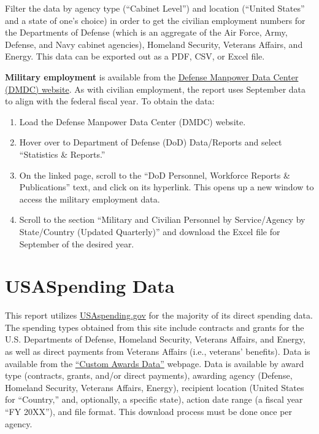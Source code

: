 \documentclass[
]{book}
\providecommand{\tightlist}{%
  \setlength{\itemsep}{0pt}\setlength{\parskip}{0pt}}
\begin{document}
Filter the data by agency type (``Cabinet Level'') and location (``United States'' and a state of one's choice) in order to get the civilian employment numbers for the Departments of Defense (which is an aggregate of the Air Force, Army, Defense, and Navy cabinet agencies), Homeland Security, Veterans Affairs, and Energy. This data can be exported out as a PDF, CSV, or Excel file.

\textbf{Military employment} is available from the \href{https://dwp.dmdc.osd.mil/dwp/app/main}{Defense Manpower Data Center (DMDC) website}. As with civilian employment, the report uses September data to align with the federal fiscal year. To obtain the data:

\begin{enumerate}
\def\labelenumi{\arabic{enumi}.}
\tightlist
\item
  Load the Defense Manpower Data Center (DMDC) website.
\item
  Hover over to Department of Defense (DoD) Data/Reports and select ``Statistics \& Reports.''\\
\item
  On the linked page, scroll to the ``DoD Personnel, Workforce Reports \& Publications'' text, and click on its hyperlink. This opens up a new window to access the military employment data.\\
\item
  Scroll to the section ``Military and Civilian Personnel by Service/Agency by State/Country (Updated Quarterly)'' and download the Excel file for September of the desired year.
\end{enumerate}

\hypertarget{usa}{%
\section{USASpending Data}\label{usa}}

This report utilizes \href{https://www.usaspending.gov/}{USAspending.gov} for the majority of its direct spending data. The spending types obtained from this site include contracts and grants for the U.S. Departments of Defense, Homeland Security, Veterans Affairs, and Energy, as well as direct payments from Veterans Affairs (i.e., veterans' benefits). Data is available from the \href{https://www.usaspending.gov/download_center/custom_award_data}{``Custom Awards Data''} webpage. Data is available by award type (contracts, grants, and/or direct payments), awarding agency (Defense, Homeland Security, Veterans Affairs, Energy), recipient location (United States for ``Country,'' and, optionally, a specific state), action date range (a fiscal year ``FY 20XX''), and file format. This download process must be done once per agency.
\end{document}
